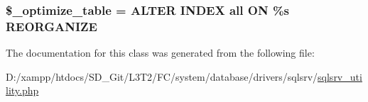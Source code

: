\subsubsection[{\$\+\_\+optimize\+\_\+table}]{\setlength{\rightskip}{0pt plus 5cm}\$\+\_\+optimize\+\_\+table = \textquotesingle{}A\+L\+T\+E\+R I\+N\+D\+E\+X {\bf all} O\+N \%s R\+E\+O\+R\+G\+A\+N\+I\+Z\+E\textquotesingle{}\hspace{0.3cm}{\ttfamily [protected]}}\label{class_c_i___d_b__sqlsrv__utility_a083199e5c22c78912dae0a47bb2d7fad}


The documentation for this class was generated from the following file\+:\begin{DoxyCompactItemize}
\item 
D\+:/xampp/htdocs/\+S\+D\+\_\+\+Git/\+L3\+T2/\+F\+C/system/database/drivers/sqlsrv/\hyperlink{sqlsrv__utility_8php}{sqlsrv\+\_\+utility.\+php}\end{DoxyCompactItemize}
